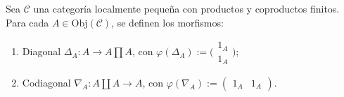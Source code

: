 \documentclass[tesis]{subfiles}
\begin{document}
\begin{Def}\label{Def: Morfismo diagonal y codiagonal}
    Sea $\mathscr{C}$ una categoría localmente pequeña con productos y coproductos finitos. Para cada $A\in\text{Obj}(\mathscr{C})$, se definen los morfismos:

    \begin{enumerate}[label=(\alph*)]
    
        \item Diagonal $\Delta_A:A\to A\prod A$, con $\varphi(\Delta_A) := \big( \begin{smallmatrix} 1_A \\ 1_A \end{smallmatrix} \big)$;

        \item Codiagonal $\nabla_A:A\coprod A\to A$, con $\varphi(\nabla_A) := (\begin{smallmatrix} 1_A &1_A \end{smallmatrix})$.
    \end{enumerate}
\end{Def}
\end{document}
